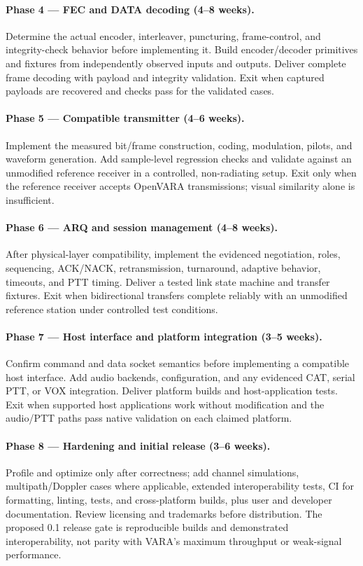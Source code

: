 \documentclass[11pt,a4paper]{article}
\begin{document}
\paragraph{Phase 4 --- FEC and DATA decoding (4--8 weeks).}
Determine the actual encoder, interleaver, puncturing, frame-control, and
integrity-check behavior before implementing it. Build encoder/decoder
primitives and fixtures from independently observed inputs and outputs.
Deliver complete frame decoding with payload and integrity validation. Exit
when captured payloads are recovered and checks pass for the validated cases.

\paragraph{Phase 5 --- Compatible transmitter (4--6 weeks).}
Implement the measured bit/frame construction, coding, modulation, pilots,
and waveform generation. Add sample-level regression checks and validate
against an unmodified reference receiver in a controlled, non-radiating
setup. Exit only when the reference receiver accepts OpenVARA transmissions;
visual similarity alone is insufficient.

\paragraph{Phase 6 --- ARQ and session management (4--8 weeks).}
After physical-layer compatibility, implement the evidenced negotiation,
roles, sequencing, ACK/NACK, retransmission, turnaround, adaptive behavior,
timeouts, and PTT timing. Deliver a tested link state machine and transfer
fixtures. Exit when bidirectional transfers complete reliably with an
unmodified reference station under controlled test conditions.

\paragraph{Phase 7 --- Host interface and platform integration (3--5 weeks).}
Confirm command and data socket semantics before implementing a compatible
host interface. Add audio backends, configuration, and any evidenced CAT,
serial PTT, or VOX integration. Deliver platform builds and host-application
tests. Exit when supported host applications work without modification and
the audio/PTT paths pass native validation on each claimed platform.

\paragraph{Phase 8 --- Hardening and initial release (3--6 weeks).}
Profile and optimize only after correctness; add channel simulations,
multipath/Doppler cases where applicable, extended interoperability tests,
CI for formatting, linting, tests, and cross-platform builds, plus user and
developer documentation. Review licensing and trademarks before distribution.
The proposed 0.1 release gate is reproducible builds and demonstrated
interoperability, not parity with VARA's maximum throughput or weak-signal
performance.
\end{document}
